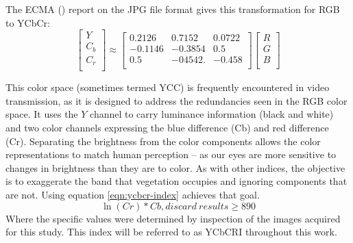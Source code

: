 \documentclass[letterpaper, notitlepage]{report}
\begin{document}
{The ECMA (\citeyear{Ecma2019-yo}) report on the JPG file format gives this transformation for RGB to YCbCr:
\nocite{Ecma2019-yo}
\begin{equation}
	\begin{bmatrix}
	Y \\[0.3em]
	C_b \\[0.3em]
	C_r \\[0.3em]
	\end{bmatrix}
	\approx
	\begin{bmatrix}
	0.2126 & 0.7152 & 0.0722 \\[0.3em]
	-0.1146 & -0.3854 & 0.5 \\[0.3em]
	0.5 & -04542. & -0.458 \\[0.3em]
	\end{bmatrix}
	\begin{bmatrix}
	R \\[0.3em]
	G \\[0.3em]
	B \\[0.3em]
	\end{bmatrix}	
\end{equation}

This color space (sometimes termed YCC) is frequently encountered in video transmission, as it is designed to address the redundancies seen in the RGB color space. It uses the $Y$ channel to carry luminance information (black and white) and two color channels expressing the blue difference (Cb) and red difference (Cr). Separating the brightness from the color components allows the color representations to match human perception -- as our eyes are more sensitive to changes in brightness than they are to color. As with other indices, the objective is to exaggerate the band that vegetation occupies and ignoring components that are not. Using equation \ref{eqn:ycbcr-index} achieves that goal.
\begin{equation}\label{eqn:ycbcr-index}
	\ln(Cr) * Cb, discard\ results\geq 890
\end{equation}
Where the specific values were determined by inspection of the images acquired for this study.
This index will be referred to as YCbCRI throughout this work.

}
\end{document}
